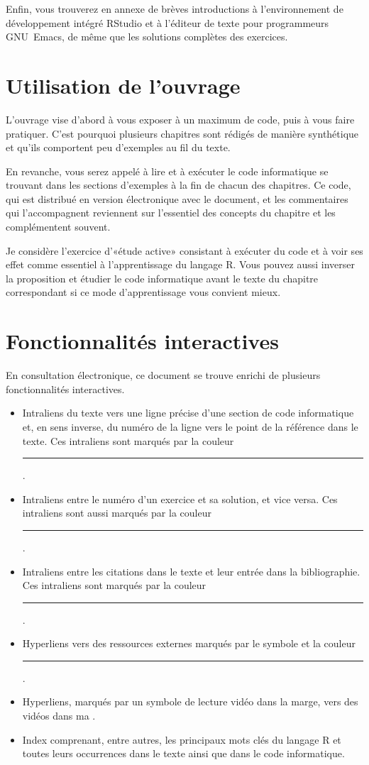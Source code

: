 \enlargethispage{5mm}

Enfin, vous trouverez en annexe de brèves introductions à
l'environnement de développement intégré RStudio et à l'éditeur de
texte pour programmeurs GNU~Emacs, de même que les solutions complètes
des exercices.

\section*{Utilisation de l'ouvrage}

L'ouvrage vise d'abord à vous exposer à un maximum de code, puis à
vous faire pratiquer. C'est pourquoi plusieurs chapitres sont rédigés
de manière synthétique et qu'ils comportent peu d'exemples au fil du
texte.

En revanche, vous serez appelé à lire et à exécuter le code
informatique se trouvant dans les sections d'exemples à la fin de
chacun des chapitres. Ce code, qui est distribué en version
électronique avec le document, et les commentaires qui l'accompagnent
reviennent sur l'essentiel des concepts du chapitre et les
complémentent souvent.

Je considère l'exercice d'«étude active» consistant à exécuter du code
et à voir ses effet comme essentiel à l'apprentissage du langage R.
Vous pouvez aussi inverser la proposition et étudier le code
informatique avant le texte du chapitre correspondant si ce mode
d'apprentissage vous convient mieux.

\section{Fonctionnalités interactives}

En consultation électronique, ce document se trouve enrichi de
plusieurs fonctionnalités interactives.
\begin{itemize}
\item Intraliens du texte vers une ligne précise d'une section de code
  informatique et, en sens inverse, du numéro de la ligne vers le
  point de la référence dans le texte. Ces intraliens sont marqués par
  la couleur \textcolor{link}{\rule{1.5em}{1.2ex}}.
\item Intraliens entre le numéro d'un exercice et sa solution, et vice
  versa. Ces intraliens sont aussi marqués par la couleur
  \textcolor{link}{\rule{1.5em}{1.2ex}}.
\item Intraliens entre les citations dans le texte et leur entrée dans
  la bibliographie. Ces intraliens sont marqués par la couleur
  \textcolor{citation}{\rule{1.5em}{1.2ex}}.
\item Hyperliens vers des ressources externes marqués par le symbole
  {\smaller\faExternalLink} et la couleur
  \textcolor{url}{\rule{1.5em}{1.2ex}}.
\item Hyperliens, marqués par un symbole de lecture vidéo
  {\smaller\faYoutubePlay} dans la marge, vers des vidéos dans ma %
  .
\item Index comprenant, entre autres, les principaux mots clés du
  langage R et toutes leurs occurrences dans le texte ainsi que
  dans le code informatique.
\end{itemize}

